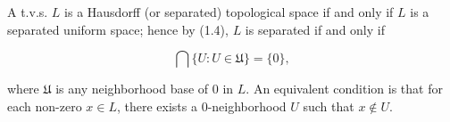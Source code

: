 A t.v.s. $L$ is a Hausdorff (or separated) topological space if and only if $L$ is a separated uniform space; hence by (1.4), $L$ is separated if and only if

$$\bigcap \{U : U \in \mathfrak{U}\} = \{0\},$$

where $\mathfrak{U}$ is any neighborhood base of $0$ in $L$. An equivalent condition is that for each non-zero $x \in L$, there exists a $0$-neighborhood $U$ such that $x \notin U$.
